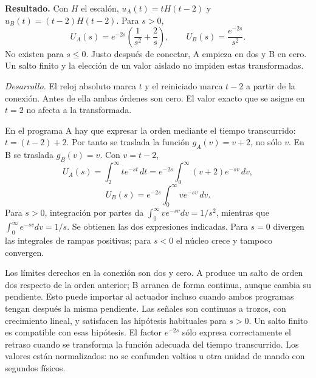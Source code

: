 \noindent\textbf{Resultado.} Con \(H\) el escalón, \(u_A(t)=tH(t-2)\) y \(u_B(t)=(t-2)H(t-2)\). Para \(s>0\),
\[
U_A(s)=e^{-2s}\left(\frac1{s^2}+\frac2s\right),\qquad
U_B(s)=\frac{e^{-2s}}{s^2}.
\]
No existen para \(s\le0\). Justo después de conectar, A empieza en dos y B en cero. Un salto finito y la elección de un valor aislado no impiden estas transformadas.

\noindent\textit{Desarrollo.} El reloj absoluto marca \(t\) y el reiniciado marca \(t-2\) a partir de la conexión. Antes de ella ambas órdenes son cero. El valor exacto que se asigne en \(t=2\) no afecta a la transformada.

En el programa A hay que expresar la orden mediante el tiempo transcurrido: \(t=(t-2)+2\). Por tanto se traslada la función \(g_A(v)=v+2\), no sólo \(v\). En B se traslada \(g_B(v)=v\). Con \(v=t-2\),
\[
U_A(s)=\int_2^\infty te^{-st}\,dt
=e^{-2s}\int_0^\infty(v+2)e^{-sv}\,dv,
\]
\[
U_B(s)=e^{-2s}\int_0^\infty ve^{-sv}\,dv.
\]
Para \(s>0\), integración por partes da \(\int_0^\infty ve^{-sv}dv=1/s^2\), mientras que \(\int_0^\infty e^{-sv}dv=1/s\). Se obtienen las dos expresiones indicadas. Para \(s=0\) divergen las integrales de rampas positivas; para \(s<0\) el núcleo crece y tampoco convergen.

Los límites derechos en la conexión son dos y cero. A produce un salto de orden dos respecto de la orden anterior; B arranca de forma continua, aunque cambia su pendiente. Esto puede importar al actuador incluso cuando ambos programas tengan después la misma pendiente. Las señales son continuas a trozos, con crecimiento lineal, y satisfacen las hipótesis habituales para \(s>0\). Un salto finito es compatible con esas hipótesis. El factor \(e^{-2s}\) sólo expresa correctamente el retraso cuando se transforma la función adecuada del tiempo transcurrido. Los valores están normalizados: no se confunden voltios u otra unidad de mando con segundos físicos.
